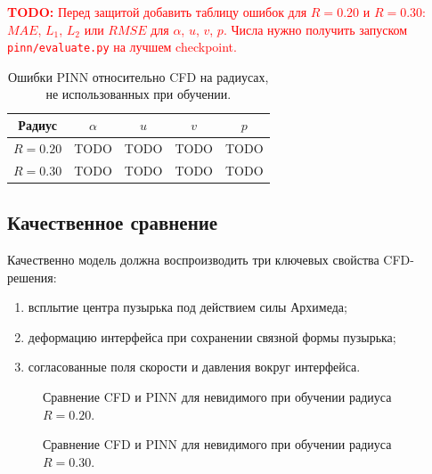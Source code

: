 \documentclass[12pt,a4paper]{article}
\newcommand{\todo}[1]{%
    \par\noindent\textcolor{red}{\textbf{TODO:} #1}\par
}
\begin{document}
\todo{Перед защитой добавить таблицу ошибок для \(R=0.20\) и \(R=0.30\):
\(MAE\), \(L_1\), \(L_2\) или \(RMSE\) для \(\alpha\), \(u\), \(v\), \(p\).
Числа нужно получить запуском \texttt{pinn/evaluate.py} на лучшем checkpoint.}

\begin{table}[h]
    \centering
    \begin{tabular}{c|cccc}
        \hline
        Радиус & \(\alpha\) & \(u\) & \(v\) & \(p\) \\
        \hline
        \(R=0.20\) & TODO & TODO & TODO & TODO \\
        \(R=0.30\) & TODO & TODO & TODO & TODO \\
        \hline
    \end{tabular}
    \caption{Ошибки PINN относительно CFD на радиусах, не использованных при обучении.}
    \label{tab:test_errors}
\end{table}

\subsection{Качественное сравнение}

Качественно модель должна воспроизводить три ключевых свойства CFD-решения:
\begin{enumerate}
    \item всплытие центра пузырька под действием силы Архимеда;
    \item деформацию интерфейса при сохранении связной формы пузырька;
    \item согласованные поля скорости и давления вокруг интерфейса.
\end{enumerate}

\begin{figure}[h]
    \centering
    \caption{Сравнение CFD и PINN для невидимого при обучении радиуса \(R=0.20\).}
    \label{fig:r020_comparison}
\end{figure}

\begin{figure}[h]
    \centering
    \caption{Сравнение CFD и PINN для невидимого при обучении радиуса \(R=0.30\).}
    \label{fig:r030_comparison}
\end{figure}
\end{document}
